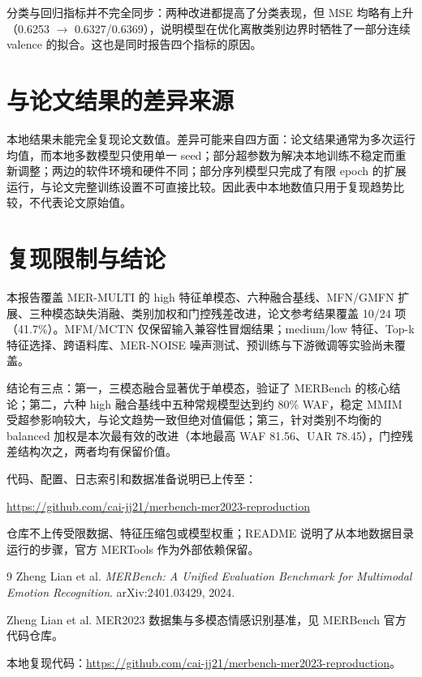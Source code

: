 ﻿\documentclass[a4paper,11pt]{ctexart}
\begin{document}
分类与回归指标并不完全同步：两种改进都提高了分类表现，但 MSE 均略有上升（0.6253 $\to$ 0.6327/0.6369），说明模型在优化离散类别边界时牺牲了一部分连续 valence 的拟合。这也是同时报告四个指标的原因。

\section{与论文结果的差异来源}
\label{sec:gaps}

本地结果未能完全复现论文数值。差异可能来自四方面：论文结果通常为多次运行均值，而本地多数模型只使用单一 seed；部分超参数为解决本地训练不稳定而重新调整；两边的软件环境和硬件不同；部分序列模型只完成了有限 epoch 的扩展运行，与论文完整训练设置不可直接比较。因此表中本地数值只用于复现趋势比较，不代表论文原始值。

\section{复现限制与结论}

本报告覆盖 MER-MULTI 的 high 特征单模态、六种融合基线、MFN/GMFN 扩展、三种模态缺失消融、类别加权和门控残差改进，论文参考结果覆盖 10/24 项（41.7\%）。MFM/MCTN 仅保留输入兼容性冒烟结果；medium/low 特征、Top-k 特征选择、跨语料库、MER-NOISE 噪声测试、预训练与下游微调等实验尚未覆盖。

结论有三点：第一，三模态融合显著优于单模态，验证了 MERBench 的核心结论；第二，六种 high 融合基线中五种常规模型达到约 80\% WAF，稳定 MMIM 受超参影响较大，与论文趋势一致但绝对值偏低；第三，针对类别不均衡的 balanced 加权是本次最有效的改进（本地最高 WAF 81.56、UAR 78.45），门控残差结构次之，两者均有保留价值。

代码、配置、日志索引和数据准备说明已上传至：
\begin{center}
\url{https://github.com/cai-jj21/merbench-mer2023-reproduction}
\end{center}
仓库不上传受限数据、特征压缩包或模型权重；README 说明了从本地数据目录运行的步骤，官方 MERTools 作为外部依赖保留。

\begin{thebibliography}{9}
Zheng Lian et al. \textit{MERBench: A Unified Evaluation Benchmark for Multimodal Emotion Recognition}. arXiv:2401.03429, 2024.

Zheng Lian et al. MER2023 数据集与多模态情感识别基准，见 MERBench 官方代码仓库。

本地复现代码：\url{https://github.com/cai-jj21/merbench-mer2023-reproduction}。
\end{thebibliography}
\end{document}
